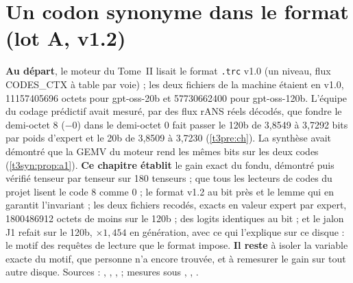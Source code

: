 
\chapter{Un codon synonyme dans le format (lot A, v1.2)}\label{t3cod:ch}

\begin{origine}
\textbf{Au départ}, le moteur du Tome~II lisait le format \texttt{.trc} v1.0 (un niveau, flux CODES\_CTX à table par voie) ; les deux fichiers de la machine étaient en v1.0, \num{11157405696} octets pour gpt-oss-20b et \num{57730662400} pour gpt-oss-120b. L'équipe du codage prédictif avait mesuré, par des flux rANS réels décodés, que fondre le demi-octet 8 ($-0$) dans le demi-octet 0 fait passer le 120b de 3,8549 à 3,7292 bits par poids d'expert et le 20b de 3,8509 à 3,7230 (\cref{t3pre:ch}). La synthèse avait démontré que la GEMV du moteur rend les mêmes bits sur les deux codes (\cref{t3syn:prop:a1}).
\textbf{Ce chapitre établit} le gain exact du fondu, démontré puis vérifié tenseur par tenseur sur 180 tenseurs ; que tous les lecteurs de codes du projet lisent le code 8 comme 0 ; le format v1.2 au bit près et le lemme qui en garantit l'invariant ; les deux fichiers recodés, exacts en valeur expert par expert, \num{1800486912} octets de moins sur le 120b ; des logits identiques au bit ; et le jalon J1 refait sur le 120b, $\times 1{,}454$ en génération, avec ce qui l'explique sur ce disque : le motif des requêtes de lecture que le format impose.
\textbf{Il reste} à isoler la variable exacte du motif, que personne n'a encore trouvée, et à remesurer le gain sur tout autre disque.
Sources : , , ,  ; mesures sous , , .
\end{origine}

